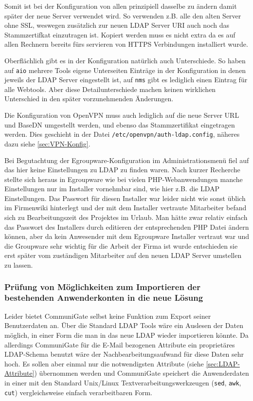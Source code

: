 \documentclass[11pt,a4paper,titlepage=firstiscover,headsepline]{scrartcl} %
\begin{document}
Somit ist bei der Konfiguration von allen prinzipiell dasselbe zu ändern damit später der neue Server verwendet wird. So verwenden z.B. alle den alten Server ohne SSL, weswegen zusätzlich zur neuen LDAP Server URI auch noch das Stammzertifkat einzutragen ist. Kopiert werden muss es nicht extra da es auf allen Rechnern bereits fürs servieren von HTTPS Verbindungen installiert wurde. 

Oberflächlich gibt es in der Konfiguration natürlich auch Unterschiede. So haben auf \texttt{aio} mehrere Tools eigene Unterseiten Einträge in der Konfiguration in denen jeweils der LDAP Server eingestellt ist, auf \texttt{nms} gibt es lediglich einen Eintrag für alle Webtools. Aber diese Detailunterschiede machen keinen wirklichen Unterschied in den später vorzunehmenden Änderungen.

Die Konfiguration von OpenVPN muss auch lediglich auf die neue Server URL und BaseDN umgestellt werden, und ebenso das Stammzertifikat eingetragen werden. Dies geschieht in der Datei \texttt{/etc/openvpn/auth-ldap.config}, näheres dazu siehe \autoref{sec:VPN-Konfig}.

Bei Begutachtung der Egroupware-Konfiguration im Administrationsmenü fiel auf das hier keine Einstellungen zu LDAP zu finden waren. Nach kurzer Recherche stellte sich heraus in Egroupware wie bei vielen PHP-Webanwendungen manche Einstellungen nur im Installer vornehmbar sind, wie hier z.B. die LDAP Einstellungen. Das Passwort für diesen Installer war leider nicht wie sonst üblich im Firmenwiki hinterlegt und der mit dem Installer vertraute Mitarbeiter befand sich zu Bearbeitungszeit des Projektes im Urlaub. Man hätte zwar relativ einfach das Passwort des Installers durch editieren der entsprechenden PHP Datei ändern können, aber da kein Anwesender mit dem Egroupware Installer vertraut war und die Groupware sehr wichtig für die Arbeit der Firma ist wurde entschieden sie erst später vom zuständigen Mitarbeiter auf den neuen LDAP Server umstellen zu lassen.

\subsubsection{Prüfung von Möglichkeiten zum Importieren der bestehenden Anwenderkonten in die neue Lösung} \label{sec:Importsuche}
Leider bietet CommuniGate selbst keine Funktion zum Export seiner Benutzerdaten an. Über die Standard LDAP Tools wäre ein Auslesen der Daten möglich, in einer Form die man in das neue LDAP wieder importieren könnte. Da allerdings CommuniGate für die E-Mail bezogenen Attribute ein proprietäres LDAP-Schema benutzt wäre der Nachbearbeitungsaufwand für diese Daten sehr hoch. Es sollen aber einmal nur die notwendigsten Attribute (siehe \autoref{sec:LDAP-Attribute}) übernommen werden und CommuniGate speichert die Anwenderdaten in einer mit den Standard Unix/Linux Textverarbeitungswerkzeugen (\texttt{sed}, \texttt{awk}, \texttt{cut}) vergleichsweise einfach verarbeitbaren Form. 
\end{document}

